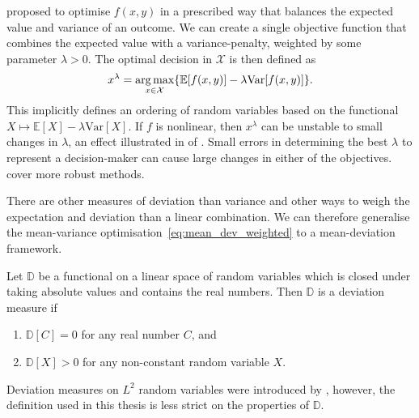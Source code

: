 \documentclass[main.tex]{subfiles}
\begin{document}
\begin{example}
  \citet{markowitz1952portfolio} proposed to optimise $f(x,y)$ in
  a prescribed way that
  balances the expected value and variance of an outcome.
  We can create a single objective function that combines
  the expected value with a variance-penalty, weighted by some
  parameter $\lambda>0$. The optimal decision in $\mathcal{X}$ is then
  defined as
  \begin{equation}\label{eq:mean_dev_weighted}
    x^{\lambda}=\operatorname*{arg\,max}_{x\in\mathcal{X}}\{\mathbb{E}[f(x,y)]-\lambda
    \mbox{Var}[f(x,y)]\}.
  \end{equation}
  This implicitly defines an ordering of random variables based on
  the functional $X\mapsto \mathbb{E}[X]-\lambda \mbox{Var}[X]$.
  If $f$ is nonlinear, then $x^{\lambda}$ can be unstable to
  small changes in $\lambda$, an effect illustrated in
   of .
  Small errors in determining the best
  $\lambda$ to represent a decision-maker can cause large changes in
  either of the objectives. \citet{marler2004survey} cover
  more robust methods.
\end{example}

There are other measures of deviation than variance and other ways to
weigh the expectation and deviation than a linear combination. We can
therefore generalise the mean-variance
optimisation~\eqref{eq:mean_dev_weighted} to a mean-deviation framework.

\begin{mydef}
  Let $\mathbb{D}$ be a functional on a linear space of random
  variables which is closed under taking absolute values and contains
  the real numbers.
  Then $\mathbb{D}$ is a deviation measure if
  \begin{enumerate}
  \item $\mathbb{D}[C] = 0$ for any real number $C$, and
  \item $\mathbb{D}[X]>0$ for any non-constant random variable $X$.
  \end{enumerate}
\end{mydef}
Deviation measures on $L^2$ random variables were introduced by
\citet{rockafellar2006generalized}, however, the definition used in this thesis
is less strict on the properties of $\mathbb{D}$.
\end{document}
